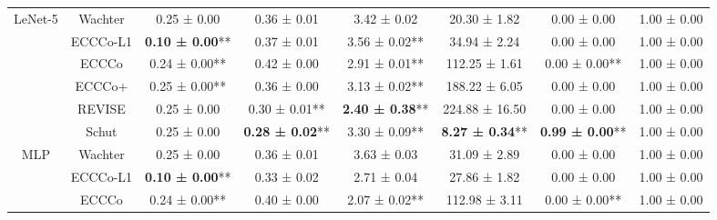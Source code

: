 \begin{table}
{\begin{tabular}[t]{cccccccc}
\multirow[t]{-6}{*}{\centering\arraybackslash LeNet-5} & Wachter & 0.25 ± 0.00\hphantom{*}\hphantom{*} & 0.36 ± 0.01\hphantom{*}\hphantom{*} & 3.42 ± 0.02\hphantom{*}\hphantom{*} & 20.30 ± 1.82\hphantom{*}\hphantom{*} & 0.00 ± 0.00\hphantom{*}\hphantom{*} & 1.00 ± 0.00\hphantom{*}\hphantom{*}\\
\cmidrule{1-8}
 & ECCCo-L1 & \textbf{0.10 ± 0.00}** & 0.37 ± 0.01\hphantom{*}\hphantom{*} & 3.56 ± 0.02** & 34.94 ± 2.24\hphantom{*}\hphantom{*} & 0.00 ± 0.00\hphantom{*}\hphantom{*} & 1.00 ± 0.00\hphantom{*}\hphantom{*}\\

 & ECCCo & 0.24 ± 0.00** & 0.42 ± 0.00\hphantom{*}\hphantom{*} & 2.91 ± 0.01** & 112.25 ± 1.61\hphantom{*}\hphantom{*} & 0.00 ± 0.00** & 1.00 ± 0.00\hphantom{*}\hphantom{*}\\

 & ECCCo+ & 0.25 ± 0.00** & 0.36 ± 0.00\hphantom{*}\hphantom{*} & 3.13 ± 0.02** & 188.22 ± 6.05\hphantom{*}\hphantom{*} & 0.00 ± 0.00\hphantom{*}\hphantom{*} & 1.00 ± 0.00\hphantom{*}\hphantom{*}\\

 & REVISE & 0.25 ± 0.00\hphantom{*}\hphantom{*} & 0.30 ± 0.01** & \textbf{2.40 ± 0.38}** & 224.88 ± 16.50\hphantom{*}\hphantom{*} & 0.00 ± 0.00\hphantom{*}\hphantom{*} & 1.00 ± 0.00\hphantom{*}\hphantom{*}\\

 & Schut & 0.25 ± 0.00\hphantom{*}\hphantom{*} & \textbf{0.28 ± 0.02}** & 3.30 ± 0.09** & \textbf{8.27 ± 0.34}** & \textbf{0.99 ± 0.00}** & 1.00 ± 0.00\hphantom{*}\hphantom{*}\\

\multirow[t]{-6}{*}{\centering\arraybackslash MLP} & Wachter & 0.25 ± 0.00\hphantom{*}\hphantom{*} & 0.36 ± 0.01\hphantom{*}\hphantom{*} & 3.63 ± 0.03\hphantom{*}\hphantom{*} & 31.09 ± 2.89\hphantom{*}\hphantom{*} & 0.00 ± 0.00\hphantom{*}\hphantom{*} & 1.00 ± 0.00\hphantom{*}\hphantom{*}\\
\cmidrule{1-8}
 & ECCCo-L1 & \textbf{0.10 ± 0.00}** & 0.33 ± 0.02\hphantom{*}\hphantom{*} & 2.71 ± 0.04\hphantom{*}\hphantom{*} & 27.86 ± 1.82\hphantom{*}\hphantom{*} & 0.00 ± 0.00\hphantom{*}\hphantom{*} & 1.00 ± 0.00\hphantom{*}\hphantom{*}\\

 & ECCCo & 0.24 ± 0.00** & 0.40 ± 0.00\hphantom{*}\hphantom{*} & 2.07 ± 0.02** & 112.98 ± 3.11\hphantom{*}\hphantom{*} & 0.00 ± 0.00** & 1.00 ± 0.00\hphantom{*}\hphantom{*}\\


\end{tabular}}
\end{table}
